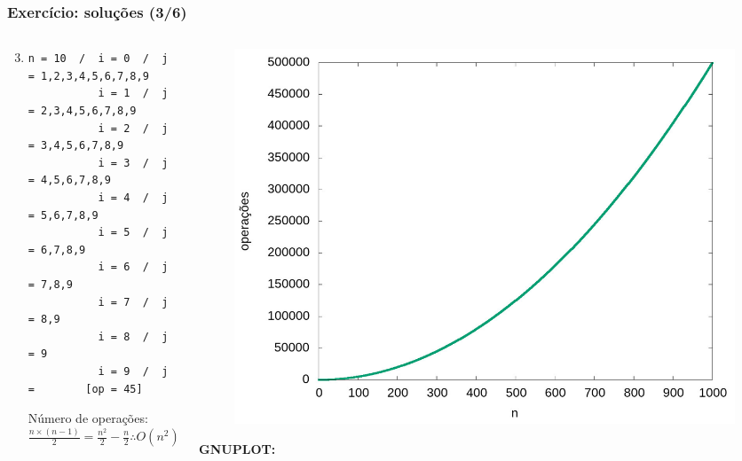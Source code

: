 \documentclass[aspectratio=169]{beamer}
\begin{document}
\begin{frame}[fragile]\frametitle{Exercício: soluções (3/6)}
\begin{columns}[T]
\begin{column}{0.5\linewidth}
\begin{enumerate}
	\setcounter{enumi}{2}
	\item {\scriptsize}
{\tiny
\begin{verbatim}
n = 10  /  i = 0  /  j = 1,2,3,4,5,6,7,8,9
           i = 1  /  j = 2,3,4,5,6,7,8,9
           i = 2  /  j = 3,4,5,6,7,8,9
           i = 3  /  j = 4,5,6,7,8,9
           i = 4  /  j = 5,6,7,8,9
           i = 5  /  j = 6,7,8,9
           i = 6  /  j = 7,8,9
           i = 7  /  j = 8,9
           i = 8  /  j = 9
           i = 9  /  j =        [op = 45]
\end{verbatim}
Número de operações: $\frac{n \times (n-1)}{2} = \frac{n^2}{2}-\frac{n}{2} \therefore O(n^2)$
}
\end{enumerate}	
\end{column}
\begin{column}{0.5\linewidth}
\begin{figure}[h]
	\centering
	\includegraphics[height=0.5\paperheight]{contagem/contagem03.jpg}
\end{figure}
{\fontsize{0}{4}\selectfont{}\textbf{GNUPLOT:}

}
\end{column}
\end{columns}
\end{frame}
\end{document}
